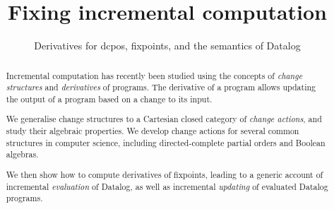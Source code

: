 
%


\usepackage[utf8]{inputenc}
\usepackage{amsmath}
\usepackage{amssymb}
\usepackage{amsthm}
\usepackage{mathtools}
\usepackage{stmaryrd}
\usepackage{thmtools}
\usepackage{todonotes}
\usepackage{etoolbox}
\usepackage{appendix}

\usepackage[safeinputenc,natbib=true]{biblatex}
\usepackage{cleveref}
\usepackage{hyperref}

\newcommand{\todoall}[1]{\todo[inline,color=black!30,author=All]{#1}}
\newcommand{\todokcg}[1]{\todo[inline,color=pink!60,author=Katriel]{#1}}
\newcommand{\todompj}[1]{\todo[inline,color=yellow!40,author=Michael]{#1}}
\newcommand{\todomario}[1]{\todo[inline,color=blue!40,author=Mario]{#1}}



\newif\ifproofs
\proofstrue





%


\begin{abstract}
  Incremental computation has recently been studied using the concepts of \emph{change
  structures} and \emph{derivatives} of programs. The derivative of a program allows updating the output
  of a program based on a change to its input.

  We generalise change structures to a Cartesian closed category of \emph{change actions},
  and study their algebraic properties. We develop change actions for several common structures
  in computer science, including directed-complete partial orders and Boolean algebras.

  We then show how to compute derivatives of fixpoints, leading to a
  generic account of incremental \emph{evaluation} of Datalog,
  as well as incremental \emph{updating} of evaluated Datalog programs.
\end{abstract}

\title{Fixing incremental computation}
\subtitle{Derivatives for dcpos, fixpoints, and the semantics of Datalog}

\maketitle

